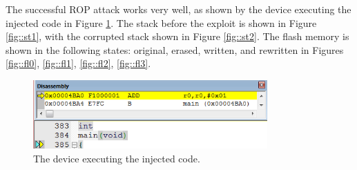 The successful ROP attack works very well, as shown by the device executing the injected code in Figure \ref{fig::ex}.  The stack before the exploit is shown in Figure \ref{fig::st1}, with the corrupted stack shown in Figure \ref{fig::st2}. The flash memory is shown in the following states: original, erased, written, and rewritten in Figures \ref{fig::fl0}, \ref{fig::fl1}, \ref{fig::fl2}, \ref{fig::fl3}. 
\begin{figure}[htbp]
	\centering
	\includegraphics[width=0.8\textwidth]{ex.PNG}
	\caption{The device executing the injected code. }\label{fig::ex}
\end{figure}


